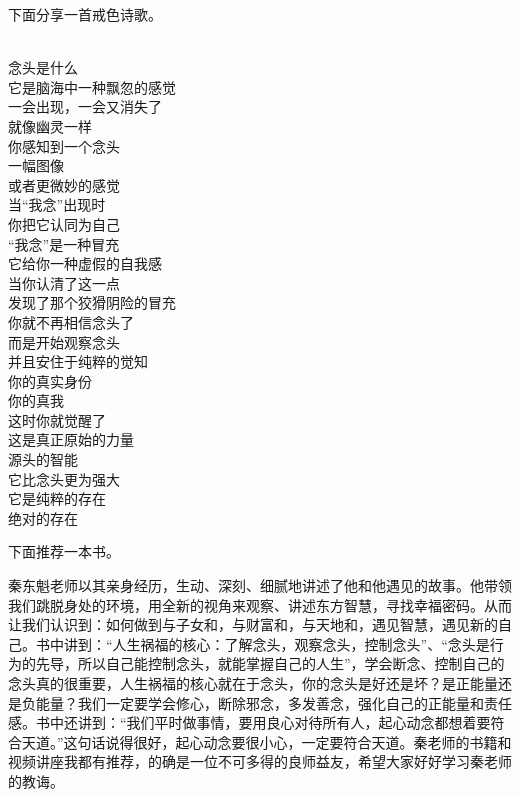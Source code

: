 下面分享一首戒色诗歌。

\begin{poem}[原力觉醒]
    \begin{multicols}{3}
        \centering~\\
        念头是什么 \\ 它是脑海中一种飘忽的感觉 \\ 一会出现，一会又消失了 \\ 就像幽灵一样 \\ 你感知到一个念头 \\ 一幅图像 \\ 或者更微妙的感觉 \\ 当“我念”出现时 \\ 你把它认同为自己 \\ “我念”是一种冒充 \\ 它给你一种虚假的自我感 \\ 当你认清了这一点 \\ 发现了那个狡猾阴险的冒充 \\ 你就不再相信念头了 \\ 而是开始观察念头 \\ 并且安住于纯粹的觉知 \\ 你的真实身份 \\ 你的真我 \\ 这时你就觉醒了 \\ 这是真正原始的力量 \\ 源头的智能 \\ 它比念头更为强大 \\ 它是纯粹的存在 \\ 绝对的存在
    \end{multicols}
\end{poem}

下面推荐一本书。

\begin{book}
    秦东魁老师以其亲身经历，生动、深刻、细腻地讲述了他和他遇见的故事。他带领我们跳脱身处的环境，用全新的视角来观察、讲述东方智慧，寻找幸福密码。从而让我们认识到：如何做到与子女和，与财富和，与天地和，遇见智慧，遇见新的自己。书中讲到：“人生祸福的核心：了解念头，观察念头，控制念头”、“念头是行为的先导，所以自己能控制念头，就能掌握自己的人生”，学会断念、控制自己的念头真的很重要，人生祸福的核心就在于念头，你的念头是好还是坏？是正能量还是负能量？我们一定要学会修心，断除邪念，多发善念，强化自己的正能量和责任感。书中还讲到：“我们平时做事情，要用良心对待所有人，起心动念都想着要符合天道。”这句话说得很好，起心动念要很小心，一定要符合天道。秦老师的书籍和视频讲座我都有推荐，的确是一位不可多得的良师益友，希望大家好好学习秦老师的教诲。
\end{book}
